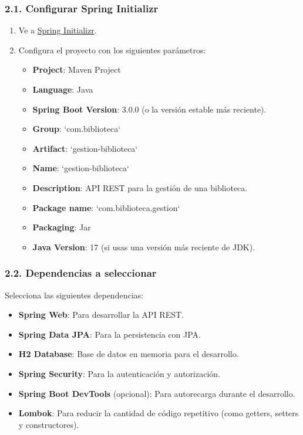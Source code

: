 \documentclass[11pt]{article}
\begin{document}
\subsubsection{2.1. Configurar Spring Initializr}
\label{sec:orga793900}
\begin{enumerate}
\item Ve a \href{https://start.spring.io/}{Spring Initializr}.
\item Configura el proyecto con los siguientes parámetros:
\begin{itemize}
\item \textbf{\textbf{Project}}: Maven Project
\item \textbf{\textbf{Language}}: Java
\item \textbf{\textbf{Spring Boot Version}}: 3.0.0 (o la versión estable más reciente).
\item \textbf{\textbf{Group}}: `com.biblioteca`
\item \textbf{\textbf{Artifact}}: `gestion-biblioteca`
\item \textbf{\textbf{Name}}: `gestion-biblioteca`
\item \textbf{\textbf{Description}}: API REST para la gestión de una biblioteca.
\item \textbf{\textbf{Package name}}: `com.biblioteca.gestion`
\item \textbf{\textbf{Packaging}}: Jar
\item \textbf{\textbf{Java Version}}: 17 (si usas una versión más reciente de JDK).
\end{itemize}
\end{enumerate}

\subsubsection{2.2. Dependencias a seleccionar}
\label{sec:org7f52a9f}
Selecciona las siguientes dependencias:
\begin{itemize}
\item \textbf{\textbf{Spring Web}}: Para desarrollar la API REST.
\item \textbf{\textbf{Spring Data JPA}}: Para la persistencia con JPA.
\item \textbf{\textbf{H2 Database}}: Base de datos en memoria para el desarrollo.
\item \textbf{\textbf{Spring Security}}: Para la autenticación y autorización.
\item \textbf{\textbf{Spring Boot DevTools}} (opcional): Para autorecarga durante el desarrollo.
\item \textbf{\textbf{Lombok}}: Para reducir la cantidad de código repetitivo (como getters, setters y constructores).
\end{itemize}
\end{document}
